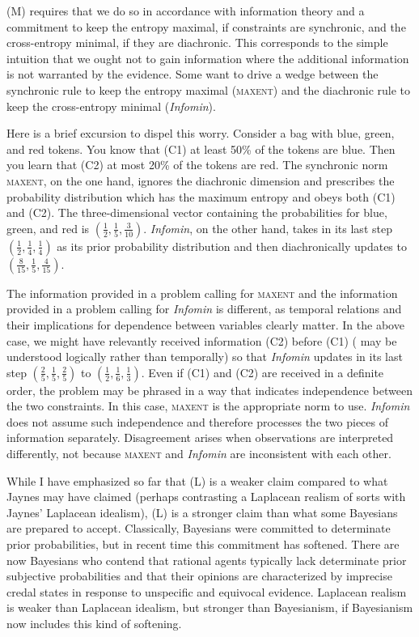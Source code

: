 \documentclass[12pt]{article}
\begin{document}
(M) requires that we do so in accordance with information theory and a
commitment to keep the entropy maximal, if constraints are synchronic,
and the cross-entropy minimal, if they are diachronic. This
corresponds to the simple intuition that we ought not to gain
information where the additional information is not warranted by the
evidence. Some want to drive a wedge between the synchronic rule to
keep the entropy maximal (\textsc{maxent}) and the diachronic rule to
keep the cross-entropy minimal (\emph{Infomin}). 

Here is a brief excursion to dispel this worry. Consider a bag with
blue, green, and red tokens. You know that (C1) at least 50\% of the
tokens are blue. Then you learn that (C2) at most 20\% of the tokens
are red. The synchronic norm \textsc{maxent}, on the one hand, ignores
the diachronic dimension and prescribes the probability distribution
which has the maximum entropy and obeys both (C1) and (C2). The
three-dimensional vector containing the probabilities for blue, green,
and red is $(\frac{1}{2},\frac{1}{5},\frac{3}{10})$. \emph{Infomin},
on the other hand, takes in its last step
$(\frac{1}{2},\frac{1}{4},\frac{1}{4})$ as its prior probability
distribution and then diachronically updates to
$(\frac{8}{15},\frac{1}{5},\frac{4}{15})$.

The information provided in a problem calling for \textsc{maxent} and
the information provided in a problem calling for \emph{Infomin} is
different, as temporal relations and their implications for dependence
between variables clearly matter. In the above case, we might have
relevantly received information (C2) before (C1) ( may
be understood logically rather than temporally) so that \emph{Infomin}
updates in its last step $(\frac{2}{5},\frac{1}{5},\frac{2}{5})$ to
$(\frac{1}{2},\frac{1}{6},\frac{1}{3})$. Even if (C1) and (C2) are
received in a definite order, the problem may be phrased in a way that
indicates independence between the two constraints. In this case,
\textsc{maxent} is the appropriate norm to use. \emph{Infomin} does
not assume such independence and therefore processes the two pieces of
information separately. Disagreement arises when observations are
interpreted differently, not because \textsc{maxent} and
\emph{Infomin} are inconsistent with each other.

While I have emphasized so far that (L) is a weaker claim compared to
what Jaynes may have claimed (perhaps contrasting a Laplacean realism
of sorts with Jaynes' Laplacean idealism), (L) is a stronger claim
than what some Bayesians are prepared to accept. Classically,
Bayesians were committed to determinate prior probabilities, but in
recent time this commitment has softened. There are now Bayesians who
contend that rational agents typically lack determinate prior
subjective probabilities and that their opinions are characterized by
imprecise credal states in response to unspecific and equivocal
evidence. Laplacean realism is weaker than Laplacean idealism, but
stronger than Bayesianism, if Bayesianism now includes this kind of
softening.
\end{document}
